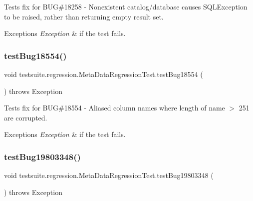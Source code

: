 Tests fix for B\+UG\#18258 -\/ Nonexistent catalog/database causes S\+Q\+L\+Exception to be raised, rather than returning empty result set.


\begin{DoxyExceptions}{Exceptions}
{\em Exception} & if the test fails. \\
\hline
\end{DoxyExceptions}
\mbox{\label{classtestsuite_1_1regression_1_1_meta_data_regression_test_ac00a7a14db2a9fd6e4c1439959c0a67d}} 
\subsubsection{\texorpdfstring{test\+Bug18554()}{testBug18554()}}
{\footnotesize\ttfamily void testsuite.\+regression.\+Meta\+Data\+Regression\+Test.\+test\+Bug18554 (\begin{DoxyParamCaption}{ }\end{DoxyParamCaption}) throws Exception}

Tests fix for B\+UG\#18554 -\/ Aliased column names where length of name $>$ 251 are corrupted.


\begin{DoxyExceptions}{Exceptions}
{\em Exception} & if the test fails. \\
\hline
\end{DoxyExceptions}
\mbox{\label{classtestsuite_1_1regression_1_1_meta_data_regression_test_ae07cbe1ade492b69942cdbb52c4ef65a}} 
\subsubsection{\texorpdfstring{test\+Bug19803348()}{testBug19803348()}}
{\footnotesize\ttfamily void testsuite.\+regression.\+Meta\+Data\+Regression\+Test.\+test\+Bug19803348 (\begin{DoxyParamCaption}{ }\end{DoxyParamCaption}) throws Exception}

